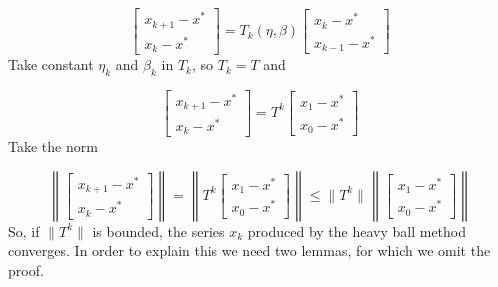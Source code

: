 \begin{equation}
\begin{bmatrix}
x_{k+1} - x^*\\
x_k - x^*
\end{bmatrix} 
=
T_k(\eta, \beta)
\begin{bmatrix}
x_{k} - x^*\\
x_{k-1} - x^*
\end{bmatrix}
\end{equation}
Take constant $\eta_k$ and $\beta_k$ in $T_k$, so $T_k = T$ and 

\begin{equation}
\begin{bmatrix}
x_{k+1} - x^*\\
x_k - x^*
\end{bmatrix} 
=
T^k
\begin{bmatrix}
x_{1} - x^*\\
x_{0} - x^*
\end{bmatrix}
\end{equation}
Take the norm

\begin{equation}
\left\lVert
\begin{bmatrix}
x_{k+1} - x^*\\
x_k - x^*
\end{bmatrix}
\right\rVert
=
\left\lVert
T^k
\begin{bmatrix}
x_{1} - x^*\\
x_{0} - x^*
\end{bmatrix}
\right\rVert
\leq
\lVert
T^k
\rVert
\left\lVert
\begin{bmatrix}
x_{1} - x^*\\
x_{0} - x^*
\end{bmatrix}
\right\rVert
\end{equation}
So, if $\lVert T^k \rVert$ is bounded, the series $x_k$ produced by the heavy ball method converges. In order to explain this we need two lemmas, for which we omit the proof.



